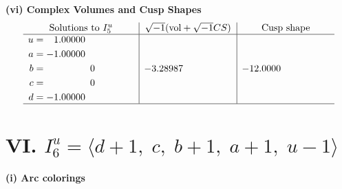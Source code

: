 \documentclass[1p]{elsarticle_modified}
\theoremstyle{definition}
\newcommand{\I}{\sqrt{-1}}
\begin{document}
\newpage\flushleft \textbf{(vi) Complex Volumes and Cusp Shapes}
$$\begin{array}{c|c|c}  
\text{Solutions to }I^u_{5}& \I (\text{vol} + \sqrt{-1}CS) & \text{Cusp shape}\\
 \hline 
\begin{aligned}
u &= \phantom{-}1.00000\phantom{ +0.000000I} \\
a &= -1.00000\phantom{ +0.000000I} \\
b &= \phantom{-0.000000 } 0 \\
c &= \phantom{-0.000000 } 0 \\
d &= -1.00000\phantom{ +0.000000I}\end{aligned}
 & -3.28987\phantom{ +0.000000I} & -12.0000\phantom{ +0.000000I}\\
 \hline 
 \end{array}$$\newpage\newpage\renewcommand{\arraystretch}{1}
\centering \section*{VI. $I^u_{6}= \langle d+1,\;c,\;b+1,\;a+1,\;u-1 \rangle$}
\flushleft \textbf{(i) Arc colorings}\\
\end{document}
